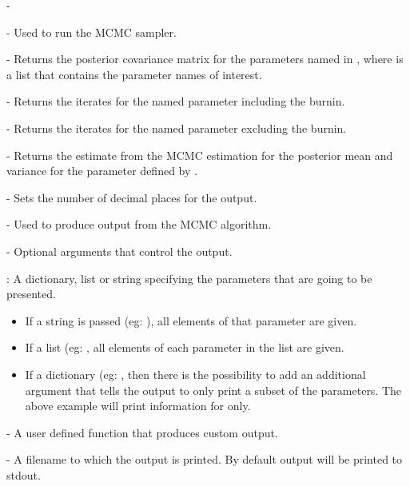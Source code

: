 -\documentclass[article]{jss}
\begin{document}
\begin{description}
\item {} - Used to run the MCMC sampler. 
\item {} - Returns the posterior
  covariance matrix for the parameters named in , where
   is a list that contains the parameter names of
  interest.
\item {} - Returns the iterates for the named
  parameter including the burnin.
\item {} - Returns the iterates for
  the named parameter excluding the burnin.
\item {} - Returns the estimate from the MCMC
  estimation for the posterior mean and variance for the parameter
  defined by .
\item {} - Sets the number of decimal
  places for the output.
\item {} - Used to produce output from the
  MCMC algorithm.
  \begin{description}
  \item {} - Optional arguments that control the
    output.
    \begin{description}
    \item {}: A dictionary, list or string specifying
      the parameters that are going to be presented.
      \begin{itemize}
      \item If a string is passed (eg: ),
        all elements of that parameter are given.
      \item If a list (eg: , all elements of each parameter in the list are
        given.
      \item If a dictionary (eg: , then there is the
        possibility to add an additional argument  that
        tells the output to only print a subset of the parameters. The
        above example will print information for  only.
      \end{itemize}
    \item {} - A user defined function that produces custom
      output.
    \item {} - A filename to which the output is printed.
      By default output will be printed to stdout.
    \end{description}
   

\end{description}
\end{description}
\end{document}

